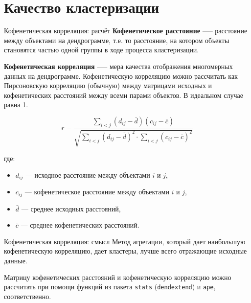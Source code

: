 \documentclass[
  ignorenonframetext,
  russian,
]{beamer}
\providecommand{\tightlist}{%
  \setlength{\itemsep}{0pt}\setlength{\parskip}{0pt}}
\begin{document}
\section{Качество
кластеризации}\label{ux43aux430ux447ux435ux441ux442ux432ux43e-ux43aux43bux430ux441ux442ux435ux440ux438ux437ux430ux446ux438ux438}

\begin{frame}{Кофенетическая корреляция: расчёт}
\protect{}\label{ux43aux43eux444ux435ux43dux435ux442ux438ux447ux435ux441ux43aux430ux44f-ux43aux43eux440ux440ux435ux43bux44fux446ux438ux44f-ux440ux430ux441ux447ux451ux442}
\textbf{Кофенетическое расстояние} ----- расстояние между объектами на
дендрограмме, т.е. то расстояние, на котором объекты становятся частью
одной группы в ходе процесса кластеризации.

\begin{block}{}
\textbf{Кофенетическая корреляция}  —-- мера качества отображения многомерных данных на дендрограмме. Кофенетическую корреляцию можно рассчитать как Пирсоновскую корреляцию (обычную) между матрицами исходных и кофенетических расстояний между всеми парами объектов. В идеальном случае равна 1. 
\end{block}

\[r = \frac{\sum_{i<j}(d_{ij} - \bar{d})(c_{ij} - \bar{c})}
{\sqrt{\sum_{i<j}(d_{ij}-\bar{d})^2 \cdot \sum_{i<j}(c_{ij}-\bar{c})^2}}\]

где:

\begin{itemize}
\tightlist
\item
  \(d_{ij}\) --- исходное расстояние между объектами \(i\) и \(j\),
\item
  \(c_{ij}\) --- кофенетическое расстояние между объектами \(i\) и
  \(j\),
\item
  \(\bar{d}\) --- среднее исходных расстояний,
\item
  \(\bar{c}\) --- среднее кофенетических расстояний.
\end{itemize}
\end{frame}

\begin{frame}[fragile]{Кофенетическая корреляция: смысл}
\protect{}\label{ux43aux43eux444ux435ux43dux435ux442ux438ux447ux435ux441ux43aux430ux44f-ux43aux43eux440ux440ux435ux43bux44fux446ux438ux44f-ux441ux43cux44bux441ux43b}
Метод агрегации, который дает наибольшую кофенетическую корреляцию, дает
кластеры, лучше всего отражающие исходные данные.

Матрицу кофенетических расстояний и кофенетическую корреляцию можно
рассчитать при помощи функций из пакета \texttt{stats}
(\texttt{dendextend}) и \texttt{ape}, соответственно.
\end{frame}
\end{document}
